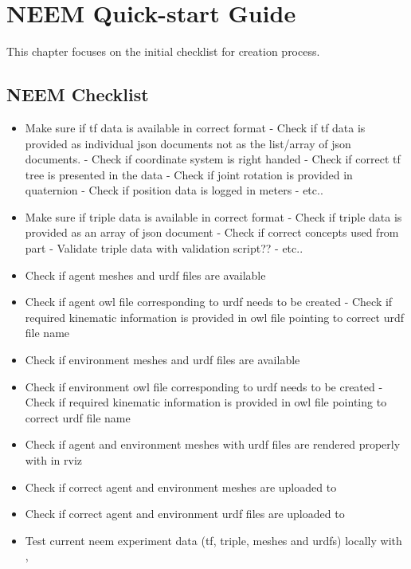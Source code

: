 \chapter{NEEM Quick-start Guide}
\label{ch:initial_checklist}

This chapter focuses on the initial checklist for \neems creation process.

\section{NEEM Checklist}

\begin{itemize}
	\item Make sure if tf data is available in correct format 
		\subitem - Check if tf data is provided as individual json documents not as the list/array of json documents.
		\subitem - Check if coordinate system is right handed
		\subitem - Check if correct tf tree is presented in the data
		\subitem - Check if joint rotation is provided in quaternion
		\subitem - Check if position data is logged in meters
		\subitem - etc..
	\item Make sure if triple data is available in correct format 
		\subitem - Check if triple data is provided as an array of json document
		\subitem - Check if correct \soma concepts used from \neemnar part
		\subitem - Validate triple data with \neem validation script??
		\subitem - etc..
		
	\item Check if agent meshes and urdf files are available
	\item Check if agent owl file corresponding to urdf needs to be created
		\subitem - Check if required kinematic information is provided in owl file pointing to correct urdf file name 
	\item Check if environment meshes and urdf files are available
	\item Check if environment owl file corresponding to urdf needs to be created
			\subitem - Check if required kinematic information is provided in owl file pointing to correct urdf file name 
	\item Check if agent and environment meshes with urdf files are rendered properly with \knowrob in rviz 
	\item Check if correct agent and environment meshes are uploaded to \neemhub
	\item Check if correct agent and environment urdf files are uploaded to \neemhub
	\item Test current neem experiment data (tf, triple, meshes and urdfs) locally with \knowrob, 
	

\end{itemize}
